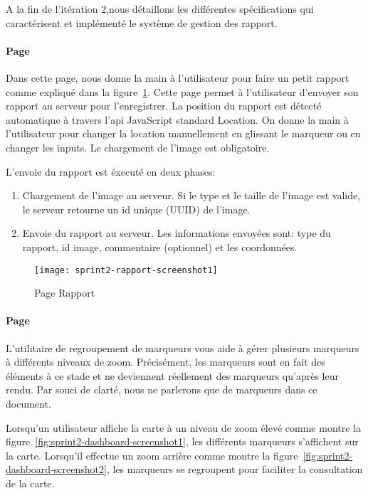 A la fin de l'itération 2,nous détaillons les différentes spécifications qui
caractérisent et implémenté le système de gestion des rapport.

\paragraph{Page }

Dans cette page, nous donne la main à l'utilisateur pour faire un petit rapport
comme expliqué dans la figure~\ref{fig:sprint2-rapport-screenshot1}. Cette
page permet à l'utilisateur d'envoyer son rapport au serveur pour
l'enregistrer.
La position du rapport est détecté automatique à travers l'api JavaScript
standard Location. On donne la main à l'utilisateur pour changer la location
manuellement en glissant le marqueur ou en changer les inputs. Le chargement
de l'image est obligatoire.


L'envoie du rapport est éxecuté en deux phases:
\begin{enumerate}
    \item Chargement de l'image au serveur. Si le type et le taille de l'image
        est valide, le serveur retourne un id unique (UUID) de l'image.
    \item Envoie du rapport au serveur. Les informations envoyées sont: type du
        rapport, id image, commentaire (optionnel) et les coordonnées.
\end{enumerate}

\begin{figure}[htbp]
    \centering
    \texttt{[image: sprint2-rapport-screenshot1]}
    \caption{Page Rapport}
    \label{fig:sprint2-rapport-screenshot1}
\end{figure}

\paragraph{Page }
L'utilitaire de regroupement de marqueurs vous aide à gérer plusieurs marqueurs
à différents niveaux de zoom. Précisément, les marqueurs sont en fait des
éléments à ce stade et ne deviennent réellement des marqueurs qu'après leur
rendu. Par souci de clarté, nous ne parlerons que de marqueurs dans ce
document.

Lorsqu'un utilisateur affiche la carte à un niveau de zoom élevé comme montre
la figure~\ref{fig:sprint2-dashboard-screenshot1}, les différents marqueurs
s'affichent sur la carte. Lorsqu'il effectue un zoom arrière comme montre la
figure~\ref{fig:sprint2-dashboard-screenshot2}, les marqueurs se regroupent
pour faciliter la consultation de la carte.

